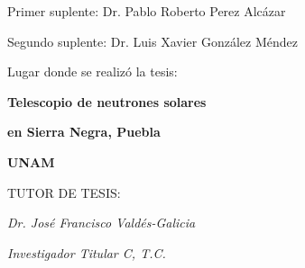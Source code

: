 \begin{titlepage}
	\large Primer suplente: Dr. Pablo Roberto Perez Alcázar

	\large Segundo suplente: Dr. Luis Xavier González Méndez

	\vspace*{35pt}
	\large Lugar donde se realizó la tesis:

	\vspace*{15pt}
	\textbf{\large Telescopio de neutrones solares}

	\textbf{\large en Sierra Negra, Puebla}

	\textbf{\large UNAM}
	\vspace*{35pt}

\begin{center}

	\Large TUTOR DE TESIS:

	\vspace*{35pt}
	\large \textit{Dr. José Francisco Valdés-Galicia}

	\large \textit{Investigador Titular C, T.C.}

\end{center}

\end{titlepage}
